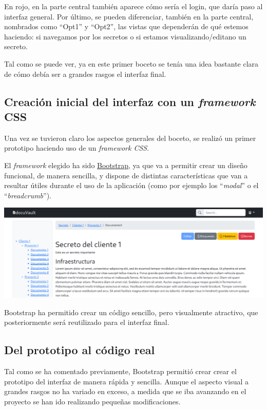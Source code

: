 \documentclass{\ClassPath/viu-tfm-template}
\begin{document}
En rojo, en la parte central también aparece cómo sería el login, que daría paso al interfaz general. Por último, se pueden diferenciar, también en la parte central, nombrados como “Opt1” y “Opt2”, las vistas que dependerán de qué estemos haciendo: si navegamos por los secretos o si estamos visualizando/editano un secreto.

Tal como se puede ver, ya en este primer boceto se tenía una idea bastante clara de cómo debía ser a grandes rasgos el interfaz final.

\subsection{Creación inicial del interfaz con un \textit{framework} CSS}
Una vez se tuvieron claro los aspectos generales del boceto, se realizó un primer prototipo haciendo uso de un \textit{framework CSS}.

El \textit{framework} elegido ha sido \href{https://getbootstrap.com/}{Bootstrap}, ya que va a permitir crear un diseño funcional, de manera sencilla, y dispone de distintas características que  van a resultar útiles durante el uso de la aplicación (como por ejemplo los “\textit{modal}” o el “\textit{breadcrumb}”).

\begin{center}
    \includegraphics[frame,width=\linewidth]{img/boceto2.png}
    \vspace{-20pt}
\end{center}

Bootstrap ha permitido crear un código sencillo, pero visualmente atractivo, que posteriormente será reutilizado para el interfaz final.


\subsection{Del prototipo al código real}

Tal como se ha comentado previamente, Bootstrap permitió crear crear el prototipo del interfaz de manera rápida y sencilla. Aunque el aspecto visual a grandes rasgos no ha variado en exceso, a medida que se iba avanzando en el proyecto se han ido realizando pequeñas modificaciones.
\end{document}
